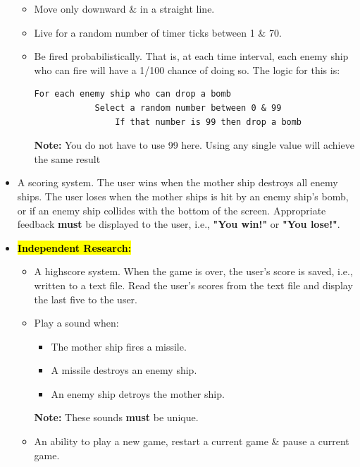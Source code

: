 \documentclass{article}
\begin{document}
\begin{itemize}
\begin{itemize}
        \item Move only downward \& in a straight line.
        \item Live for a random number of timer ticks between 1 \& 70.
        \item Be fired probabilistically. That is, at each time interval, each enemy ship who can fire will have a 1/100 chance of doing so. The logic for this is:
        \begin{Verbatim}[tabsize=2]
        For each enemy ship who can drop a bomb
            Select a random number between 0 & 99
                If that number is 99 then drop a bomb   
        \end{Verbatim}
        \textbf{Note:} You do not have to use 99 here. Using any single value will achieve the same result
    \end{itemize}
    \item A scoring system. The user wins when the mother ship destroys all enemy ships. The user loses when the mother ships is hit by an enemy ship's bomb, or if an enemy ship collides with the bottom of the screen. Appropriate feedback \textbf{must} be displayed to the user, i.e., \textbf{"You win!"} or \textbf{"You lose!"}.
    \item \hl{\textbf{Independent Research:}}
    \begin{itemize}
        \item A highscore system. When the game is over, the user's score is saved, i.e., written to a text file. Read the user's scores from the text file and display the last five to the user.
        \item Play a sound when:
        \begin{itemize}
            \item The mother ship fires a missile.
            \item A missile destroys an enemy ship.
            \item An enemy ship detroys the mother ship.
        \end{itemize}
        \textbf{Note:} These sounds \textbf{must} be unique.
        \item An ability to play a new game, restart a current game \& pause a current game.
    \end{itemize}
\end{itemize}
\end{document}
